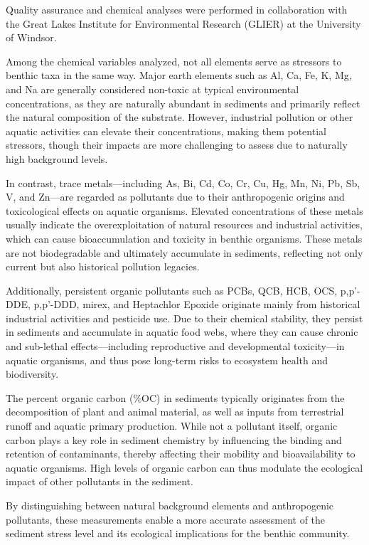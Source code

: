 Quality assurance and chemical analyses were performed in collaboration with the Great Lakes
Institute for Environmental Research (GLIER) at the University of Windsor\cite{Zhang2008}.

Among the chemical variables analyzed, not all elements serve as stressors to benthic taxa in the same way.
Major earth elements such as Al, Ca, Fe, K, Mg, and Na are generally considered non-toxic at typical 
environmental concentrations, as they are naturally abundant in sediments and primarily reflect the 
natural composition of the substrate. However, industrial pollution or other aquatic activities 
can elevate their concentrations, making them potential stressors, though their impacts are more 
challenging to assess due to naturally high background levels.

In contrast, trace metals—including As, Bi, Cd, Co, Cr, Cu, Hg, Mn, Ni, Pb, Sb, V, and 
Zn—are regarded as pollutants due to their anthropogenic origins and toxicological effects
on aquatic organisms. Elevated concentrations of these metals usually indicate the overexploitation 
of natural resources and industrial activities, which can cause bioaccumulation and toxicity in benthic organisms. 
These metals are not biodegradable and ultimately accumulate in sediments, reflecting not only current 
but also historical pollution legacies.

Additionally, persistent organic pollutants such as PCBs, QCB, HCB, OCS, p,p'-DDE, p,p'-DDD, mirex, and
Heptachlor Epoxide originate mainly from historical industrial activities and pesticide use.
Due to their chemical stability, they persist in sediments and accumulate in aquatic food webs,
where they can cause chronic and sub-lethal effects—including reproductive and developmental 
toxicity—in aquatic organisms, and thus pose long-term risks to ecosystem health and biodiversity.

The percent organic carbon (\%OC) in sediments typically originates from the decomposition of
plant and animal material, as well as inputs from terrestrial runoff and aquatic primary production.
While not a pollutant itself, organic carbon plays a key role in sediment chemistry by 
influencing the binding and retention of contaminants, thereby affecting their mobility 
and bioavailability to aquatic organisms. High levels of organic carbon can thus modulate
the ecological impact of other pollutants in the sediment.

By distinguishing between natural background elements and anthropogenic pollutants,
these measurements enable a more accurate assessment of the sediment stress level and 
its ecological implications for the benthic community.


